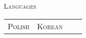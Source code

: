 





{\fontsize{12}{10}\textsc{Languages}} 

\vspace{3mm}
\begin{minipage}{\linewidth}
\begin{tabularx}{\linewidth}{ >{\raggedright}X >{\raggedright}X }
         \fontsize{11}{10}\textsc{Polish} &
	 \fontsize{11}{10}\textsc{Korean} & 
	 &
\end{tabularx}
\end{minipage}


